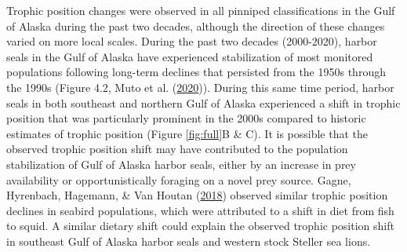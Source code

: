 \documentclass [11pt, proquest] {uwthesis}[2015/03/03]
\begin{document}
Trophic position changes were observed in all pinniped classifications
in the Gulf of Alaska during the past two decades, although the
direction of these changes varied on more local scales. During the past
two decades (2000-2020), harbor seals in the Gulf of Alaska have
experienced stabilization of most monitored populations following
long-term declines that persisted from the 1950s through the 1990s
(Figure 4.2, Muto et al. (\protect\hyperlink{ref-Muto2020}{2020})).
During this same time period, harbor seals in both southeast and
northern Gulf of Alaska experienced a shift in trophic position that was
particularly prominent in the 2000s compared to historic estimates of
trophic position (Figure \ref{fig:full}B \& C). It is possible that the
observed trophic position shift may have contributed to the population
stabilization of Gulf of Alaska harbor seals, either by an increase in
prey availability or opportunistically foraging on a novel prey source.
Gagne, Hyrenbach, Hagemann, \& Van Houtan
(\protect\hyperlink{ref-Gagne2018}{2018}) observed similar trophic
position declines in seabird populations, which were attributed to a
shift in diet from fish to squid. A similar dietary shift could explain
the observed trophic position shift in southeast Gulf of Alaska harbor
seals and western stock Steller sea lions.
\end{document}
